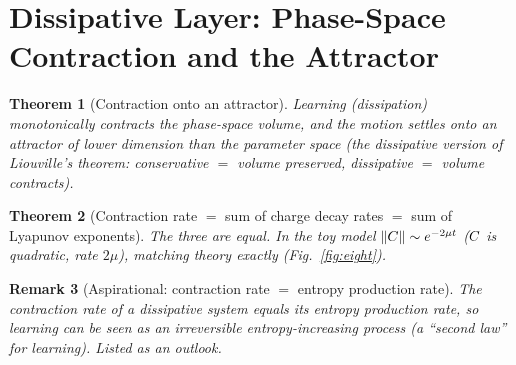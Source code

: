\documentclass[11pt]{article}
\newtheorem{Theorem}{Theorem}[section]
\newtheorem{Remark}[Theorem]{Remark}
\begin{document}
\section{Dissipative Layer: Phase-Space Contraction and the Attractor}\label{sec:dissipative}
\begin{Theorem}[Contraction onto an attractor]\label{thm:contract}
Learning (dissipation) monotonically contracts the phase-space volume, and the motion settles onto
an attractor of lower dimension than the parameter space (the dissipative version of Liouville's
theorem: conservative $=$ volume preserved, dissipative $=$ volume contracts).
\end{Theorem}

\begin{Theorem}[Contraction rate $=$ sum of charge decay rates $=$ sum of Lyapunov exponents]\label{thm:rate}
The three are equal. In the toy model $\left\lVert C \right\rVert\sim e^{-2\mu t}$ ($C$ is quadratic, rate
$2\mu$), matching theory exactly (Fig.~\ref{fig:eight}).
\end{Theorem}

\begin{Remark}[Aspirational: contraction rate $=$ entropy production rate]
The contraction rate of a dissipative system equals its entropy production rate, so learning can be
seen as an irreversible entropy-increasing process (a ``second law'' for learning). Listed as an
outlook.
\end{Remark}

\end{document}
